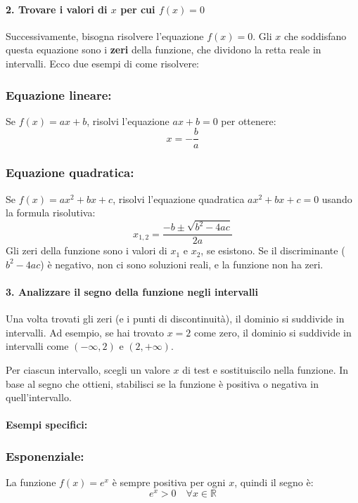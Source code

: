 \documentclass{article}
\begin{document}
\paragraph{2. Trovare i valori di \( x \) per cui \( f(x) = 0 \)}
Successivamente, bisogna risolvere l'equazione \( f(x) = 0 \). Gli \( x \) che soddisfano questa equazione sono i \textbf{zeri} della funzione, che dividono la retta reale in intervalli.  
Ecco due esempi di come risolvere:

\subsubsection*{Equazione lineare:}
Se \(f(x) = ax + b\), risolvi l'equazione \( ax + b = 0 \) per ottenere:
\[
x = -\frac{b}{a}
\]

\subsubsection*{Equazione quadratica:}
Se \(f(x) = ax^2 + bx + c\), risolvi l'equazione quadratica \( ax^2 + bx + c = 0 \) usando la formula risolutiva:
\[
x_{1,2} = \frac{-b \pm \sqrt{b^2 - 4ac}}{2a}
\]
Gli zeri della funzione sono i valori di \( x_1 \) e \( x_2 \), se esistono. Se il discriminante (\( b^2 - 4ac \)) è negativo, non ci sono soluzioni reali, e la funzione non ha zeri.

\paragraph{3. Analizzare il segno della funzione negli intervalli}
Una volta trovati gli zeri (e i punti di discontinuità), il dominio si suddivide in intervalli. Ad esempio, se hai trovato \( x = 2 \) come zero, il dominio si suddivide in intervalli come \( (-\infty, 2) \) e \( (2, +\infty) \).

Per ciascun intervallo, scegli un valore \( x \) di test e sostituiscilo nella funzione. In base al segno che ottieni, stabilisci se la funzione è positiva o negativa in quell'intervallo.

\paragraph{Esempi specifici:}

\subsubsection*{Esponenziale:}
La funzione \( f(x) = e^x \) è sempre positiva per ogni \( x \), quindi il segno è:
\[
e^x > 0 \quad \forall x \in \mathbb{R}
\]
\end{document}
